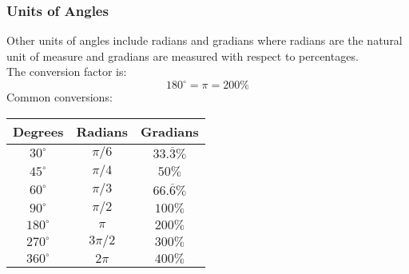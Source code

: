\subsubsection{Units of Angles}
Other units of angles include radians and gradians where radians are the natural unit of measure and gradians are measured with respect to percentages.\\
The conversion factor is:
$$180^\circ=\pi=200\%$$
Common conversions:\\
\begin{tabular}{c|c|c}
    Degrees & Radians & Gradians\\
    \hline
    $30^\circ$ & $\pi/6$ & $33.\overline{3}\%$\\
    $45^\circ$ & $\pi/4$ & $50\%$\\
    $60^\circ$ & $\pi/3$ & $66.\overline{6}\%$\\
    $90^\circ$ & $\pi/2$ & $100\%$\\
    $180^\circ$ & $\pi$ & $200\%$\\
    $270^\circ$ & $3\pi/2$ & $300\%$\\
    $360^\circ$ & $2\pi$ & $400\%$
\end{tabular}